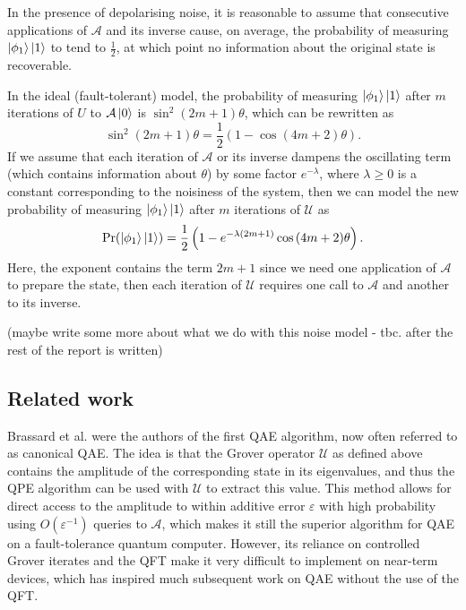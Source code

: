 In the presence of depolarising noise, it is reasonable to assume that consecutive applications of $\mathcal{A}$ and its inverse cause, on average, the probability of measuring $\ket{\phi_1}\ket{1}$ to tend to $\frac{1}{2}$, at which point no information about the original state is recoverable.

In the ideal (fault-tolerant) model, the probability of measuring $\ket{\phi_1} \ket{1}$ after $m$ iterations of $U$ to $\mathcal{A} \ket{0}$ is $\sin^2{(2m+1) \theta }$, which can be rewritten as
\[
\sin^2{(2m+1) \theta } = \frac{1}{2} \left( 1 - \cos{ (4m+2) \theta } \right).
\]
If we assume that each iteration of $\mathcal{A}$ or its inverse dampens the oscillating term (which contains information about $\theta$) by some factor $e^{-\lambda}$, where $\lambda \geq 0$ is a constant corresponding to the noisiness of the system, then we can model the new probability of measuring $\ket{\phi_1}\ket{1}$ after $m$ iterations of $\mathcal{U}$ as
\[
\Pr(\ket{\phi_1} \ket{1}) = \frac{1}{2} \left( 1 - e^{- \lambda (2m+1)} \cos{ (4m+2) \theta } \right).
\]
Here, the exponent contains the term $2m+1$ since we need one application of $\mathcal{A}$ to prepare the state, then each iteration of $\mathcal{U}$ requires one call to $\mathcal{A}$ and another to its inverse.

{\color{purple} (maybe write some more about what we do with this noise model - tbc. after the rest of the report is written)}

\subsection{Related work}

Brassard et al. \cite{brassard_2002_q_amp_amp} were the authors of the first QAE algorithm, now often referred to as canonical QAE. The idea is that the Grover operator $\mathcal{U}$ as defined above contains the amplitude of the corresponding state in its eigenvalues, and thus the QPE algorithm can be used with $\mathcal{U}$ to extract this value. This method allows for direct access to the amplitude to within additive error $\varepsilon$ with high probability using $O(\varepsilon^{-1})$ queries to $\mathcal{A}$, which makes it still the superior algorithm for QAE on a fault-tolerance quantum computer. However, its reliance on controlled Grover iterates and the QFT make it very difficult to implement on near-term devices, which has inspired much subsequent work on QAE without the use of the QFT.

